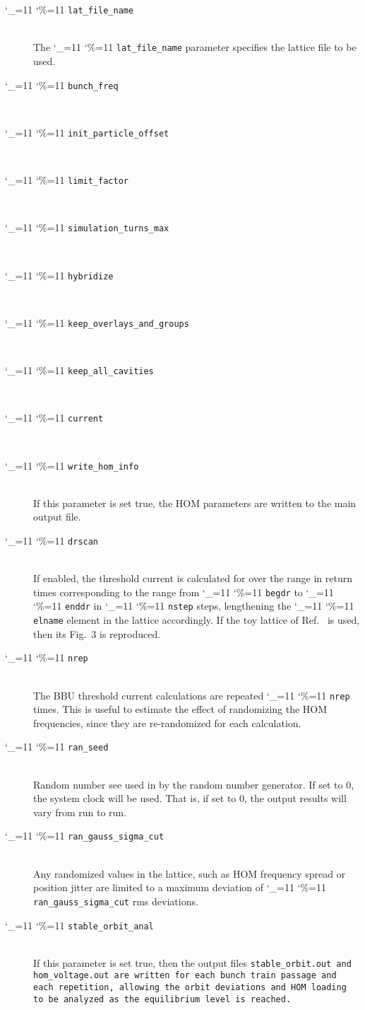 \documentclass[11pt]{article}
\newcommand\ttcmd{\begingroup\catcode`\_=11 \catcode`\%=11 \dottcmd}
\newcommand\dottcmd[1]{\texttt{#1}\endgroup}
\newcommand{\vn}{\ttcmd}
\newcommand{\Newline}{\hfil \\}
\begin{document}
  \begin{description}
  \item[\vn{lat_file_name}] \Newline
The \vn{lat_file_name} parameter specifies the lattice file to be used.
  \item[\vn{bunch_freq}] \Newline
  \item[\vn{init_particle_offset}] \Newline
  \item[\vn{limit_factor}] \Newline
  \item[\vn{simulation_turns_max}] \Newline
  \item[\vn{hybridize}] \Newline
  \item[\vn{keep_overlays_and_groups}] \Newline
  \item[\vn{keep_all_cavities}] \Newline
  \item[\vn{current}] \Newline
  \item[\vn{write_hom_info}] \Newline
If this parameter is set true, the HOM parameters are written to the main output file.
  \item[\vn{drscan}] \Newline
If enabled, the threshold current is calculated for over the range in return times
corresponding to the range from \vn{begdr} to \vn{enddr} in  \vn{nstep} steps,
lengthening the \vn{elname} element in the lattice accordingly. If the toy lattice
of Ref.~\cite{ref:Hoffstaetter04} is used, then its Fig.~3 is reproduced.
  \item[\vn{nrep}] \Newline
The BBU threshold current calculations are repeated \vn{nrep} times. This is useful
to estimate the effect of randomizing the HOM frequencies, since they are re-randomized for
each calculation.
  \item[\vn{ran_seed}] \Newline
Random number see used in by the random number generator. If set to 0, the system clock
will be used. That is, if set to 0, the output results will vary from run to run. 
  \item[\vn{ran_gauss_sigma_cut}] \Newline
Any randomized values in the lattice, such as HOM frequency spread or position jitter
are limited to a maximum deviation of \vn{ran_gauss_sigma_cut} rms deviations. 
  \item[\vn{stable_orbit_anal}] \Newline
If this parameter is set true, then the output files \tt{stable_orbit.out} and \tt{hom_voltage.out}
are written for each bunch train passage and each repetition, allowing the orbit deviations
and HOM loading to be analyzed as the equilibrium level is reached.

\end{description}
\end{document}
